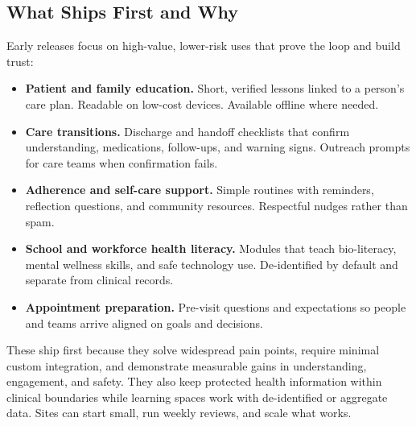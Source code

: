 \documentclass[12pt]{article}
\begin{document}
\subsection*{What Ships First and Why}
Early releases focus on high-value, lower-risk uses that prove the loop and build trust:
\begin{itemize}[leftmargin=*]
  \item \textbf{Patient and family education.} Short, verified lessons linked to a person’s care plan. Readable on low-cost devices. Available offline where needed.
  \item \textbf{Care transitions.} Discharge and handoff checklists that confirm understanding, medications, follow-ups, and warning signs. Outreach prompts for care teams when confirmation fails.
  \item \textbf{Adherence and self-care support.} Simple routines with reminders, reflection questions, and community resources. Respectful nudges rather than spam.
  \item \textbf{School and workforce health literacy.} Modules that teach bio-literacy, mental wellness skills, and safe technology use. De-identified by default and separate from clinical records.
  \item \textbf{Appointment preparation.} Pre-visit questions and expectations so people and teams arrive aligned on goals and decisions.
\end{itemize}
These ship first because they solve widespread pain points, require minimal custom integration, and demonstrate measurable gains in understanding, engagement, and safety. They also keep protected health information within clinical boundaries while learning spaces work with de-identified or aggregate data. Sites can start small, run weekly reviews, and scale what works.
\end{document}
